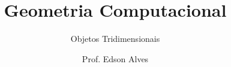 \title{Geometria Computacional}
\subtitle{Objetos Tridimensionais}
\date{}
\author{Prof. Edson Alves}
